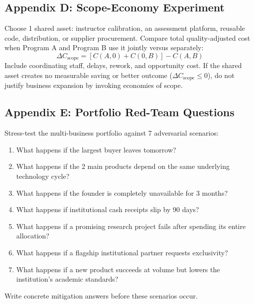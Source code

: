 \subsection*{Appendix D: Scope-Economy Experiment}
\label{sec:appendix_d_scope_economy_experiment}

Choose 1 shared asset: instructor calibration, an assessment platform, reusable code, distribution, or supplier procurement. Compare total quality-adjusted cost when Program A and Program B use it jointly versus separately:
\begin{equation}
\label{eq:scope_economy_test}
\Delta C_{\text{scope}} = [C(A,0) + C(0,B)] - C(A,B)
\end{equation}
Include coordinating staff, delays, rework, and opportunity cost. If the shared asset creates no measurable saving or better outcome ($\Delta C_{\text{scope}} \le 0$), do not justify business expansion by invoking economies of scope.

\subsection*{Appendix E: Portfolio Red-Team Questions}
\label{sec:appendix_e_portfolio_red_team}

Stress-test the multi-business portfolio against 7 adversarial scenarios:
\begin{enumerate}
    \item What happens if the largest buyer leaves tomorrow?
    \item What happens if the 2 main products depend on the same underlying technology cycle?
    \item What happens if the founder is completely unavailable for 3 months?
    \item What happens if institutional cash receipts slip by 90 days?
    \item What happens if a promising research project fails after spending its entire allocation?
    \item What happens if a flagship institutional partner requests exclusivity?
    \item What happens if a new product succeeds at volume but lowers the institution's academic standards?
\end{enumerate}
Write concrete mitigation answers before these scenarios occur.

